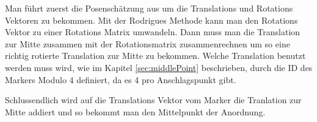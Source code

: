 Man führt zuerst die Posenschätzung aus um die Translations und Rotations Vektoren zu bekommen.
Mit der Rodrigues Methode kann man den Rotations Vektor zu einer Rotations Matrix umwandeln.
Dann muss man die Translation zur Mitte zusammen mit der Rotationsmatrix zusammenrechnen um so eine richtig rotierte Translation zur Mitte zu bekommen.
Welche Translation benutzt werden muss wird, wie im Kapitel \ref{sec:middlePoint} beschrieben, durch die ID des Markers Modulo 4 definiert, da es 4 pro Anschlagspunkt gibt.

Schlussendlich wird auf die Translations Vektor vom Marker die Tranlation zur Mitte addiert und so bekommt man den Mittelpunkt der Anordnung.


